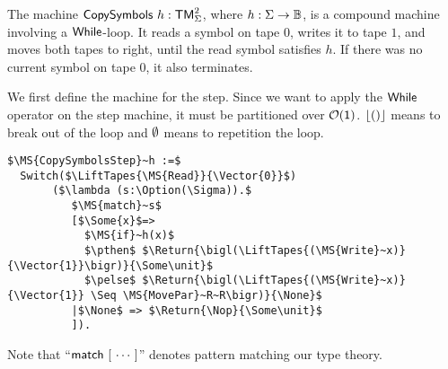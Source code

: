 The machine $\mathsf{CopySymbols}~h : \mathsf{TM}_\Sigma^2$, where $h:\Sigma\rightarrow\mathbb{B}$, is a compound machine involving a $\mathsf{While}$-loop.  It reads a symbol on tape
$0$, writes it to tape $1$, and moves both tapes to right, until the read symbol satisfies $h$.  If there was no current symbol on tape $0$, it also
terminates.

We first define the machine for the step.  Since we want to apply the $\mathsf{While}$ operator on the step machine, it must be partitioned over
$\mathcal{O}(\mathsf{1})$.  $\left\lfloor {\ensuremath{\mathsf{()}}} \right\rfloor$ means to break out of the loop and $\emptyset$ means to repetition the loop.
\begin{definition}
  \label{CopySymbols_Step}
\begin{lstlisting}[style=semicoqstyle]
$\MS{CopySymbolsStep}~h :=$
  Switch($\LiftTapes{\MS{Read}}{\Vector{0}}$)
       ($\lambda (s:\Option(\Sigma)).$
          $\MS{match}~s$
          [$\Some{x}$=>
            $\MS{if}~h(x)$
            $\pthen$ $\Return{\bigl(\LiftTapes{(\MS{Write}~x)}{\Vector{1}}\bigr)}{\Some\unit}$ 
            $\pelse$ $\Return{\bigl(\LiftTapes{(\MS{Write}~x)}{\Vector{1}} \Seq \MS{MovePar}~R~R\bigr)}{\None}$ 
          |$\None$ => $\Return{\Nop}{\Some\unit}$ 
          ]).
\end{lstlisting}
\end{definition}

Note that ``$\mathsf{match}~[~\cdots~]$'' denotes pattern matching our type theory.

